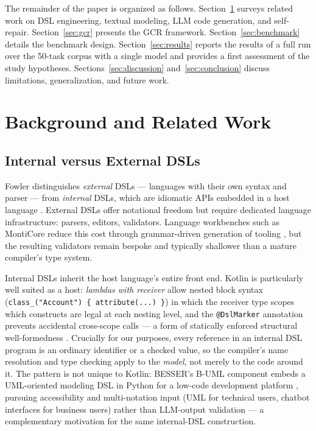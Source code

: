\documentclass[acmsmall,nonacm]{acmart}
\begin{document}
The remainder of the paper is organized as follows. Section~\ref{sec:related} surveys related work on DSL engineering, textual modeling, LLM code generation, and self-repair. Section~\ref{sec:gcr} presents the GCR framework. Section~\ref{sec:benchmark} details the benchmark design. Section~\ref{sec:results} reports the results of a full run over the 50-task corpus with a single model and provides a first assessment of the study hypotheses. Sections~\ref{sec:discussion} and~\ref{sec:conclusion} discuss limitations, generalization, and future work.

\section{Background and Related Work}
\label{sec:related}

\subsection{Internal versus External DSLs}

Fowler distinguishes \emph{external} DSLs --- languages with their own syntax and parser --- from \emph{internal} DSLs, which are idiomatic APIs embedded in a host language \citep{fowler2010}. External DSLs offer notational freedom but require dedicated language infrastructure: parsers, editors, validators. Language workbenches such as MontiCore reduce this cost through grammar-driven generation of tooling \citep{krahn2010}, but the resulting validators remain bespoke and typically shallower than a mature compiler's type system.

Internal DSLs inherit the host language's entire front end. Kotlin is particularly well suited as a host: \emph{lambdas with receiver} allow nested block syntax (\texttt{class\_("Account") \{ attribute(...) \}}) in which the receiver type scopes which constructs are legal at each nesting level, and the \texttt{@DslMarker} annotation prevents accidental cross-scope calls --- a form of statically enforced structural well-formedness \citep{ghosh2010,fowler2010}. Crucially for our purposes, every reference in an internal DSL program is an ordinary identifier or a checked value, so the compiler's name resolution and type checking apply to the \emph{model}, not merely to the code around it. The pattern is not unique to Kotlin: BESSER's B-UML component embeds a UML-oriented modeling DSL in Python for a low-code development platform \citep{alfonso2024}, pursuing accessibility and multi-notation input (UML for technical users, chatbot interfaces for business users) rather than LLM-output validation --- a complementary motivation for the same internal-DSL construction.
\end{document}
